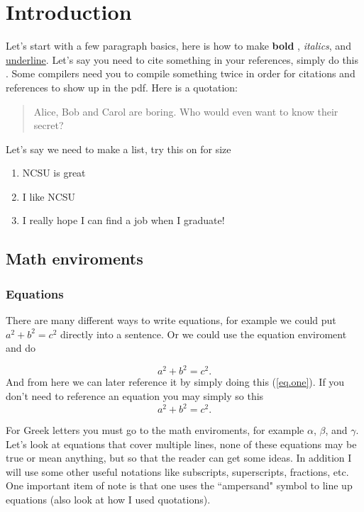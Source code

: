 \chapter{Introduction}
\label{chap-one}
Let's start with a few paragraph basics, here is how to make \textbf{bold} , \textit{italics}, and \underline{underline}.  Let's say you need to cite something in your references, simply do this \cite{t06}.  Some compilers need you to compile something twice in order for citations and references to show up in the pdf.  Here is a quotation:
\begin{quotation}
Alice, Bob and Carol are boring.  Who would even want to know their secret?
\end{quotation}

Let's say we need to make a list, try this on for size
\begin{enumerate}
\item NCSU is great\\
\item I like NCSU\\
\item I really hope I can find a job when I graduate!
\end{enumerate} 

\section{Math enviroments}
\subsection{Equations}

There are many different ways to write equations, for example we could put $a^2 + b^2 = c^2$ directly into a sentence.  Or we could use the equation enviroment and do 

\begin{equation}\label{eq.one}
a^2+b^2=c^2.
\end{equation} And from here we can later reference it by simply doing this (\ref{eq.one}).  If you don't need to reference an equation you may simply so this $$a^2 + b^2 = c^2.$$

For Greek letters you must go to the math enviroments, for example $\alpha$, $\beta$, and $\gamma$.  Let's look at equations that cover multiple lines, none of these equations may be true or mean anything, but so that the reader can get some ideas.  In addition I will use some other useful notations like subscripts, superscripts, fractions, etc.  One important item of note is that one uses the ``ampersand" symbol to line up equations (also look at how I used quotations).

